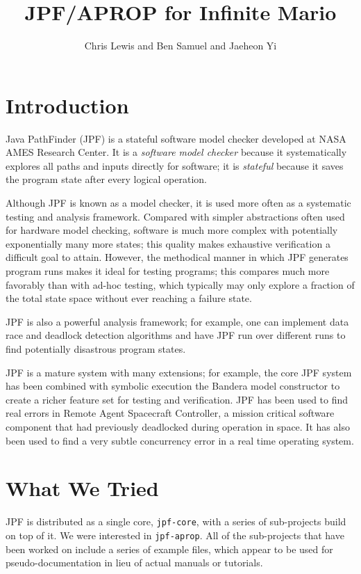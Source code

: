 \documentclass[twocolumn]{article}
\title{JPF/APROP for Infinite Mario}
\author{Chris Lewis and Ben Samuel and Jaeheon Yi}
\begin{document}
\maketitle

\section{Introduction}
Java PathFinder (JPF) is a stateful software model checker developed at NASA AMES Research Center. 
It is a \emph{software model checker} because it systematically explores all paths and inputs directly for software;
it is \emph{stateful} because it saves the program state after every logical operation. 

Although JPF is known as a model checker, it is used more often as a systematic testing and analysis framework. 
Compared with simpler abstractions often used for hardware model checking, software is much more complex with potentially exponentially many more states;
this quality makes exhaustive verification a difficult goal to attain. 
However, the methodical manner in which JPF generates program runs makes it ideal for testing programs; 
this compares much more favorably than with ad-hoc testing, which typically may only explore a fraction of the total state space without ever reaching a failure state. 

JPF is also a powerful analysis framework; for example, one can implement data race and deadlock detection algorithms and have JPF run over different runs to find potentially disastrous program states. 

JPF is a mature system with many extensions; for example, the core JPF system has been combined with symbolic execution the Bandera model constructor to create a richer feature set for testing and verification. 
JPF has been used to find real errors in Remote Agent Spacecraft Controller, a mission critical software component that had previously deadlocked during operation in space. 
It has also been used to find a very subtle concurrency error in a real time operating system. 



\section{What We Tried}
JPF is distributed as a single core, \texttt{jpf-core}, with a series of sub-projects build on top of it. We were interested in \texttt{jpf-aprop}. All of the sub-projects that have been worked on include a series of example files, which appear to be used for pseudo-documentation in lieu of actual manuals or tutorials.
\end{document}

